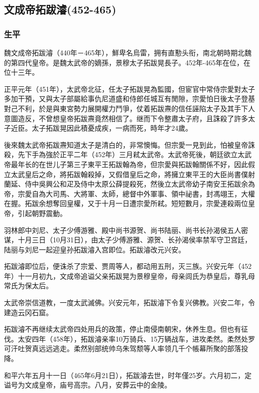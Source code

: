 
\subsection{文成帝拓跋濬\tiny(452-465)}

\subsubsection{生平}

魏文成帝拓跋濬（440年－465年），鮮卑名烏雷，拥有直懃头衔，南北朝時期北魏的第四代皇帝。是魏太武帝的嫡孫，景穆太子拓跋晃長子。452年-465年在位，在位十三年。

正平元年（451年），太武帝北征，任太子拓跋晃為監國，但宦官中常侍宗愛對太子多加干預，又與太子部屬給事仇尼道盛和侍郎任城互有閒隙，宗愛怕日後太子登基對己不利，於是與東宮勢力展開權力鬥爭，仗着拓跋燾的信任誣陷太子及其手下人意圖造反，不曾想皇帝拓跋燾竟然相信了。继而下令整肅太子府，且誅殺了許多太子近臣。太子拓跋晃因此積憂成疾，一病而死，時年才24歲。

後來魏太武帝拓跋燾知道太子是清白的，非常懊悔。但宗愛一見到此，怕被皇帝誅殺，先下手為強於正平二年（452年）三月弒太武帝。太武帝死後，朝廷欲立太武帝最年长的在世儿子第三子東平王拓跋翰為帝，但宗愛與拓跋翰關係不好，因此假立太武皇后之命，將拓跋翰殺掉，又假借皇后之命，將擁立東平王的大臣尚書僕射蘭延、侍中吳興公和疋及侍中太原公薛提殺死，然後立太武帝幼子南安王拓跋余為帝，宗愛自為大司馬、大將軍、太師，總督中外軍事、領中祕書，封馮翊王，大權在握。拓跋余想奪回皇權，又于十月一日遭宗愛所弒。短短數月，宗愛連殺兩位皇帝，引起朝野震動。

羽林郎中刘尼、太子少傅游雅、殿中尚书源贺、尚书陆丽、尚书长孙渴侯五人密谋，十月三日（10月31日），由太子少傅游雅、源贺、长孙渴侯率禁军守卫宫廷，陆丽与刘尼一起迎皇孙拓跋濬入宫即位。拓跋濬改元兴安。

拓跋濬即位后，便诛杀了宗爱、贾周等人，都动用五刑，灭三族。兴安元年（452年）十一月初九，文成帝追谥父亲拓跋晃为景穆皇帝，母亲闾氏为恭皇后，尊乳母常氏为保太后。

太武帝崇信道教，一度太武滅佛。兴安元年，拓跋濬下令复兴佛教。兴安二年，令建造云冈石窟。

拓跋濬不再继续太武帝四处用兵的政策，停止南侵南朝宋，休养生息。但也有征伐。太安四年（458年），拓跋濬亲率10万骑兵、15万辆战车，进攻柔然。柔然处罗可汗吐贺真远远逃走。柔然别部统帅乌朱驾颓等人率领几千个帳幕所聚的部落投降。

和平六年五月十一日（465年6月21日），拓跋濬去世，时年僅25岁。六月初二，定谥号为文成皇帝，庙号高宗。八月，安葬云中的金陵。

